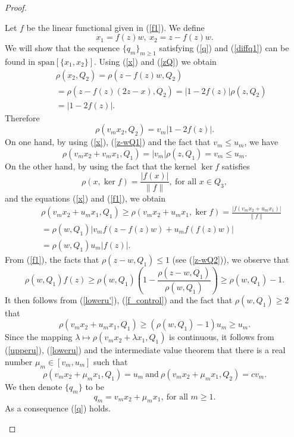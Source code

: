 \documentclass[12pt, reqno]{amsart}
\theoremstyle{definition}
\theoremstyle{remark}
\numberwithin{equation}{section}
\begin{document}
\begin{proof}
\begin{description}
Let $f$ be the linear functional given in (\ref{f1}). We define
 \begin{equation}
 \label{x}
x_1=f(z)w,~x_2=z-f(z)w.
 \end{equation}
 We will show that the sequence $\{q_m\}_{m\ge1}$ satisfying (\ref{q}) and (\ref{diffq1}) can be found in $\mbox{span}[\{x_1,x_2\}]$. Using (\ref{x}) and (\ref{zQ}) we obtain
\begin{eqnarray*}
 &&\rho(x_2,Q_2)= \rho(z-f(z)w,Q_2)\\
 &&=\rho (z-f(z)(2z-x), Q_2)=\left|1-2f(z)\right|\rho(z,Q_2)\\
 &&=|1-2f(z)|.
 \end{eqnarray*}
 Therefore
 \begin{equation}
 \label{upper1}
 \rho(v_mx_2,Q_2)=v_m\left|1-2f(z)\right|.
 \end{equation}
 On one hand, by using (\ref{x}), (\ref{z-wQ1})  and the fact that $v_m\le u_m$, we have
 \begin{equation}
 \label{upperu}
\rho(v_mx_2+v_mx_1,Q_1)=|v_m|\rho(z,Q_1)=v_m\le u_m.
 \end{equation}
 On the other hand, by using the fact that the kernel $\ker f$ satisfies
 \begin{equation}
 \label{kerf}
 \rho(x,\ker f)=\frac{|f(x)|}{\|f\|},~\mbox{for all $x\in Q_3$},
 \end{equation}
 and the equations (\ref{x}) and (\ref{f1}), we obtain
\begin{eqnarray}
\label{loweru'}
&&\rho(v_mx_2+u_mx_1,Q_1)\ge \rho(v_mx_2+u_mx_1,\ker f)=\frac{|f(v_mx_2+u_mx_1)|}{\|f\|}\nonumber\\
&&=\rho(w,Q_1)\left|v_mf(z-f(z)w)+u_mf(f(z) w)\right|\nonumber\\
&&=\rho(w,Q_1)u_m\left|f(z)\right|.
\end{eqnarray}
From (\ref{f1}), the facts that $\rho(z-w,Q_1)\le1$ (see (\ref{z-wQ2})), we observe that
\begin{equation}
\label{f_control}
\rho(w,Q_1)f(z)\ge \rho(w,Q_1)\left(1-\frac{\rho(z-w,Q_1)}{\rho(w,Q_1)}\right)\ge\rho(w,Q_1)-1.
\end{equation}
It then follows from (\ref{loweru'}), (\ref{f_control}) and the fact that $\rho(w,Q_1)\ge2$ that
\begin{equation}
\label{loweru}
\rho(v_mx_2+u_mx_1,Q_1)\ge \left(\rho(w,Q_1)-1\right)u_m\ge  u_m.
\end{equation}
Since the mapping $\lambda \longmapsto \rho(v_mx_2+\lambda x_1,Q_1)$ is continuous, it follows from (\ref{upperu}), (\ref{loweru})  and the intermediate value theorem that there is a real number $\mu_m\in[v_m,u_m]$ such that
$$
\rho(v_mx_2+\mu_m x_1,Q_1)=u_m~\mbox{and}~\rho(v_mx_2+\mu_m x_1,Q_2)=cv_m.
$$
We then denote $\{q_m\}$ to be
\begin{equation}
\label{q1}
q_m=v_mx_2+\mu_m x_1,~\mbox{for all $m\ge1$}.
\end{equation}
As a consequence (\ref{q}) holds.


\end{description}
\end{proof}
\end{document}

